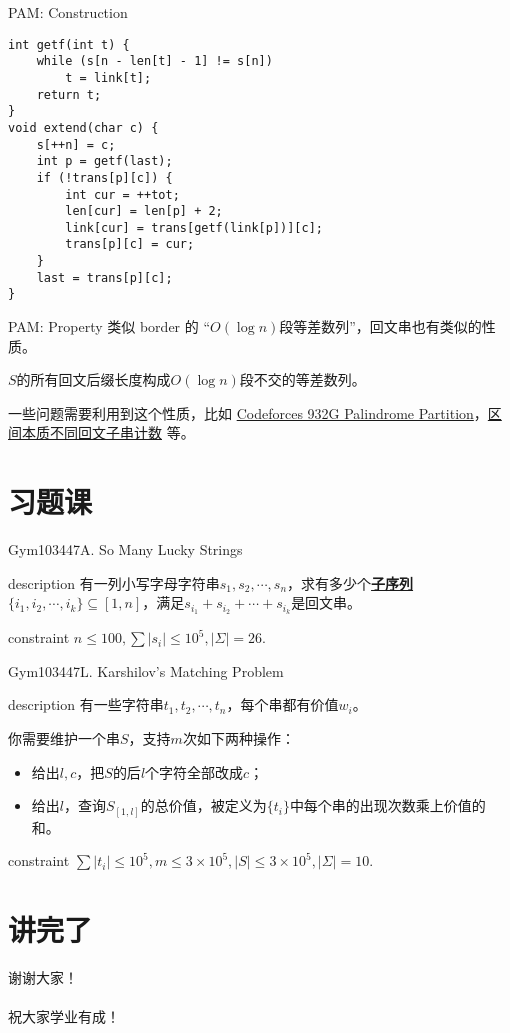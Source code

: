 \documentclass{beamer}
\theoremstyle{compact}
\def\obj#1{\textbf{\uline{#1}}}
\def\le{\leqslant}
\begin{document}
\begin{frame}[fragile]{PAM: Construction}
	\begin{verbatim}
int getf(int t) {
    while (s[n - len[t] - 1] != s[n])
        t = link[t];
    return t;
}
void extend(char c) {
    s[++n] = c;
    int p = getf(last);
    if (!trans[p][c]) {
        int cur = ++tot;
        len[cur] = len[p] + 2;
        link[cur] = trans[getf(link[p])][c];
        trans[p][c] = cur;
    }
    last = trans[p][c];
}
	\end{verbatim}
\end{frame}
\begin{frame}{PAM: Property}
	类似 border 的 “$O(\log n)$段等差数列”，回文串也有类似的性质。
	
	\begin{lemma}
		$S$的所有回文后缀长度构成$O(\log n)$段不交的等差数列。
	\end{lemma}

	一些问题需要利用到这个性质，比如 \href{http://codeforces.com/problemset/problem/932/G}{Codeforces 932G Palindrome Partition}，\href{https://loj.ac/p/6070}{区间本质不同回文子串计数} 等。
\end{frame}
\section{习题课}
\begin{frame}{Gym103447A. So Many Lucky Strings}
	\begin{block}{description}
		有一列小写字母字符串$s_1, s_2, \cdots, s_n$，求有多少个\obj{子序列}$\{i_1, i_2, \cdots, i_k\} \subseteq [1, n]$，满足$s_{i_1} + s_{i_2} + \cdots + s_{i_k}$是回文串。
	\end{block}
	\begin{block}{constraint}
		$n \le 100, \sum |s_i| \le 10^5, |\Sigma| = 26.$
	\end{block}
\end{frame}
\begin{frame}{Gym103447L. Karshilov's Matching Problem}
	\begin{block}{description}
		有一些字符串$t_1, t_2, \cdots, t_n$，每个串都有价值$w_i$。

		你需要维护一个串$S$，支持$m$次如下两种操作：\begin{itemize}
			\item 给出$l, c$，把$S$的后$l$个字符全部改成$c$；
			\item 给出$l$，查询$S_{[1, l]}$的总价值，被定义为$\{t_i\}$中每个串的出现次数乘上价值的和。
		\end{itemize}
	\end{block}
	\begin{block}{constraint}
		$\sum |t_i| \le 10^5, m \le 3 \times 10^5, |S| \le 3 \times 10^5, |\Sigma| = 10.$
	\end{block}
\end{frame}
\section{讲完了}
\begin{frame}
	\begin{center}
		{\huge 谢谢大家！\\~\\  \large 祝大家学业有成！}
	\end{center}
\end{frame}
\end{document}
